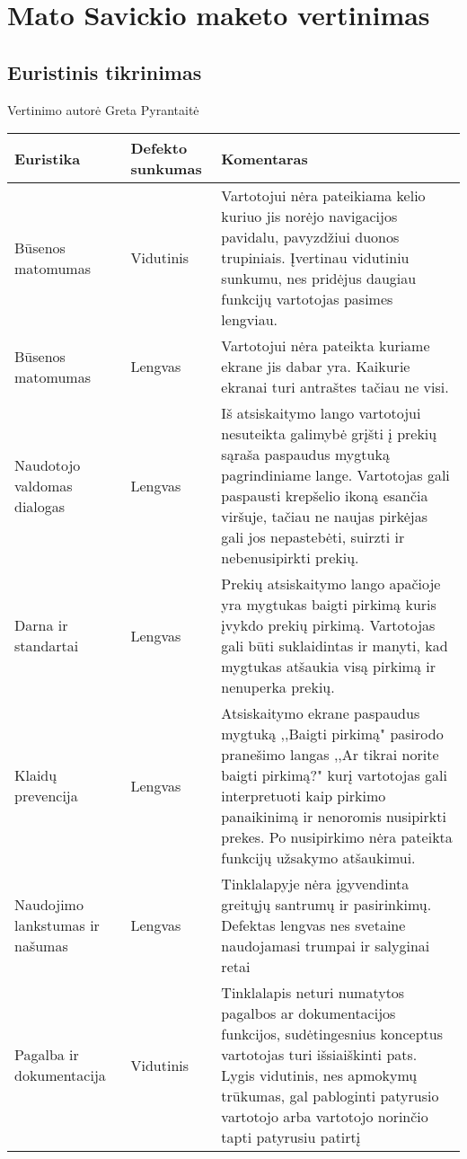 \documentclass[oneside]{VUMIFPSkursinis}
\begin{document}
\section{Mato Savickio maketo vertinimas}
	\subsection{Euristinis tikrinimas}
Vertinimo autorė Greta Pyrantaitė
\begin{center}
    \begin{tabular}{ |p{3cm}| p{3cm} | p{11cm} | }
    \hline
    	Euristika &Defekto sunkumas & Komentaras \\ \hline 
	Būsenos matomumas & Vidutinis & Vartotojui nėra pateikiama kelio kuriuo jis norėjo navigacijos pavidalu, pavyzdžiui duonos trupiniais. Įvertinau vidutiniu sunkumu, nes pridėjus daugiau funkcijų vartotojas pasimes lengviau. \\ \hline
	Būsenos matomumas & Lengvas & Vartotojui nėra pateikta kuriame ekrane jis dabar yra. Kaikurie ekranai turi antraštes tačiau ne visi. \\ \hline
	Naudotojo valdomas dialogas & Lengvas & Iš atsiskaitymo lango vartotojui nesuteikta galimybė grįšti į prekių sąraša paspaudus mygtuką pagrindiniame lange. Vartotojas gali paspausti krepšelio ikoną esančia viršuje, tačiau ne naujas pirkėjas gali jos nepastebėti, suirzti ir nebenusipirkti prekių. \\ \hline
	Darna ir standartai & Lengvas & Prekių atsiskaitymo lango apačioje yra mygtukas baigti pirkimą kuris įvykdo prekių pirkimą. Vartotojas gali būti suklaidintas ir manyti, kad mygtukas atšaukia visą pirkimą ir nenuperka prekių. \\ \hline 
	Klaidų prevencija & Lengvas & Atsiskaitymo ekrane paspaudus mygtuką ,,Baigti pirkimą" pasirodo pranešimo langas ,,Ar tikrai norite baigti pirkimą?" kurį vartotojas gali interpretuoti kaip pirkimo panaikinimą ir nenoromis nusipirkti prekes. Po nusipirkimo nėra pateikta funkcijų užsakymo atšaukimui. \\ \hline 
	Naudojimo lankstumas ir našumas & Lengvas & Tinklalapyje nėra įgyvendinta greitųjų santrumų ir pasirinkimų. Defektas lengvas nes svetaine naudojamasi trumpai ir salyginai retai \\ \hline
	Pagalba ir dokumentacija & Vidutinis & Tinklalapis neturi numatytos pagalbos ar dokumentacijos funkcijos, sudėtingesnius konceptus vartotojas turi išsiaiškinti pats. Lygis vidutinis, nes apmokymų trūkumas, gal pabloginti patyrusio vartotojo arba vartotojo norinčio tapti patyrusiu patirtį \\ \hline
	
   \hline
    \end{tabular}
\end{center}
\pagebreak
\end{document}
